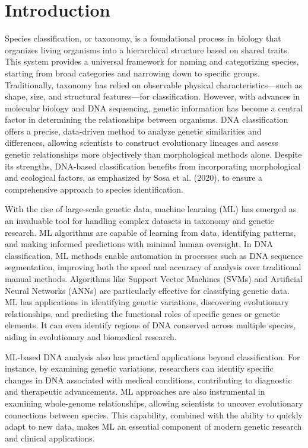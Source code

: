 \section{Introduction}
Species classification, or taxonomy, is a foundational process in biology that organizes living organisms into a hierarchical structure based on shared traits. This system provides a universal framework for naming and categorizing species, starting from broad categories and narrowing down to specific groups. Traditionally, taxonomy has relied on observable physical characteristics—such as shape, size, and structural features—for classification. However, with advances in molecular biology and DNA sequencing, genetic information has become a central factor in determining the relationships between organisms. DNA classification offers a precise, data-driven method to analyze genetic similarities and differences, allowing scientists to construct evolutionary lineages and assess genetic relationships more objectively than morphological methods alone. Despite its strengths, DNA-based classification benefits from incorporating morphological and ecological factors, as emphasized by Sosa et al. (2020), to ensure a comprehensive approach to species identification.

With the rise of large-scale genetic data, machine learning (ML) has emerged as an invaluable tool for handling complex datasets in taxonomy and genetic research. ML algorithms are capable of learning from data, identifying patterns, and making informed predictions with minimal human oversight. In DNA classification, ML methods enable automation in processes such as DNA sequence segmentation, improving both the speed and accuracy of analysis over traditional manual methods. Algorithms like Support Vector Machines (SVMs) and Artificial Neural Networks (ANNs) are particularly effective for classifying genetic data. ML has applications in identifying genetic variations, discovering evolutionary relationships, and predicting the functional roles of specific genes or genetic elements. It can even identify regions of DNA conserved across multiple species, aiding in evolutionary and biomedical research.

ML-based DNA analysis also has practical applications beyond classification. For instance, by examining genetic variations, researchers can identify specific changes in DNA associated with medical conditions, contributing to diagnostic and therapeutic advancements. ML approaches are also instrumental in examining whole-genome relationships, allowing scientists to uncover evolutionary connections between species. This capability, combined with the ability to quickly adapt to new data, makes ML an essential component of modern genetic research and clinical applications.

